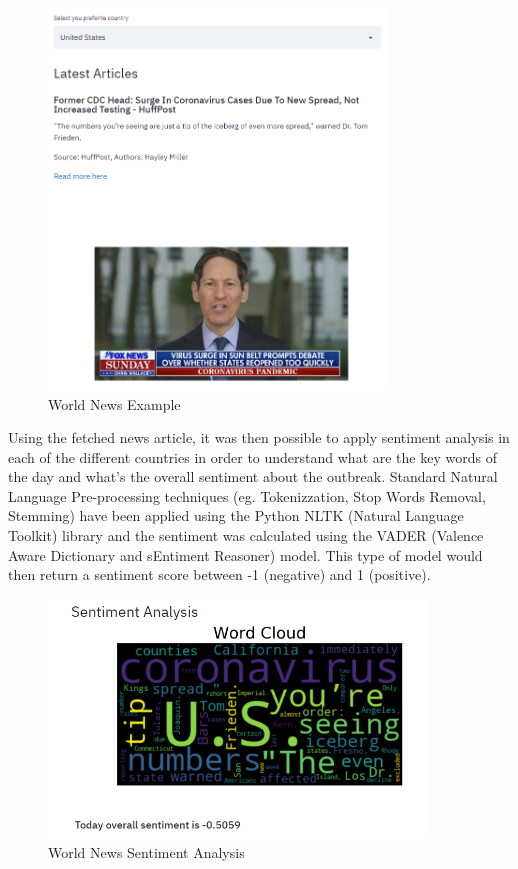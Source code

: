 \begin{figure}[ht!]%
    \centering
    \includegraphics[width=9cm]{latex/images/news.PNG}%
    \caption{World News Example}
    \label{news}
\end{figure}

Using the fetched news article, it was then possible to apply sentiment analysis in each of the different countries in order to understand what are the key words of the day and what's the overall sentiment about the outbreak. Standard Natural Language Pre-processing techniques (eg. Tokenizzation, Stop Words Removal, Stemming) have been applied using the Python NLTK (Natural Language Toolkit) library and the sentiment was calculated using the VADER (Valence Aware Dictionary and sEntiment Reasoner) model. This type of model would then return a sentiment score between -1 (negative) and 1 (positive).

\begin{figure}[ht!]%
    \centering
    \includegraphics[width=10cm]{latex/images/news2.PNG}%
    \caption{World News Sentiment Analysis}
    \label{news2}
\end{figure}
